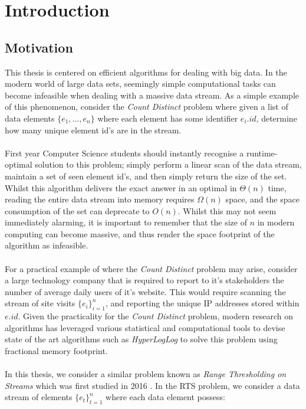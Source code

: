 \section{Introduction}

\subsection{Motivation}
This thesis is centered on efficient algorithms for dealing with big data. In the modern world of large data sets, seemingly simple computational tasks can become infeasible when dealing with a massive data stream. As a simple example of this phenomenon, consider the \textit{Count Distinct} problem where given a list of data elements $\{e_1,\dots, e_n\}$ where each element has some identifier $e_i.id$, determine how many unique element id's are in the stream.\\
\\
First year Computer Science students should instantly recognise a runtime-optimal solution to this problem; simply perform a linear scan of the data stream, maintain a set of seen element id's, and then simply return the size of the set. Whilst this algorithm delivers the exact answer in an optimal in $\Theta(n)$ time, reading the entire data stream into memory requires $\Omega(n)$ space, and the space consumption of the set can deprecate to $O(n)$. Whilst this may not seem immediately alarming, it is important to remember that the size of $n$ in modern computing can become massive, and thus render the space footprint of the algorithm as infeasible. \\
\\
For a practical example of where the \textit{Count Distinct} problem may arise, consider a large technology company that is required to report to it's stakeholders the number of average daily users of it's website. This would require scanning the stream of site visits $\{e_i\}_{i=1}^{n}$, and reporting the unique IP addresses stored within $e.id$. Given the practicality for the \textit{Count Distinct} problem, modern research on algorithms has leveraged various statistical and computational tools to devise state of the art algorithms such as \textit{HyperLogLog} \cite{karppa2022hyperlogloglog} to solve this problem using fractional memory footprint.  \\
\\
In this thesis, we consider a similar problem known as \textit{Range Thresholding on Streams} which was first studied in 2016 \cite{Gan2016}. In the RTS problem, we consider a data stream of elements $\{e_t\}^{n}_{t=1}$ where each data element possess: 
